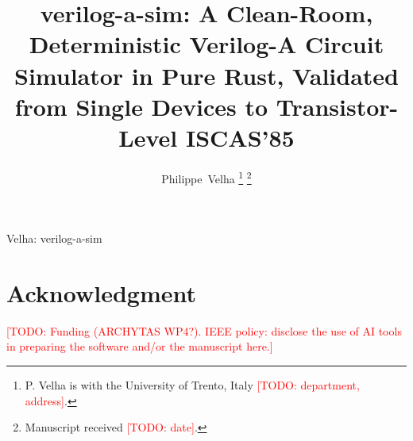 \documentclass[journal]{IEEEtran}
\newif\ifdraft \drafttrue
\newcommand{\todo}[1]{\ifdraft\textcolor{red}{[TODO: #1]}\fi}
\begin{document}
\title{verilog-a-sim: A Clean-Room, Deterministic Verilog-A Circuit Simulator in Pure Rust,
Validated from Single Devices to Transistor-Level ISCAS'85}

\author{Philippe~Velha%
\thanks{P. Velha is with the University of Trento, Italy \todo{department, address}.}%
\thanks{Manuscript received \todo{date}.}}

%
{Velha: verilog-a-sim}

\maketitle















\section*{Acknowledgment}
\todo{Funding (ARCHYTAS WP4?). IEEE policy: disclose the use of AI tools in preparing the
software and/or the manuscript here.}



\end{document}
